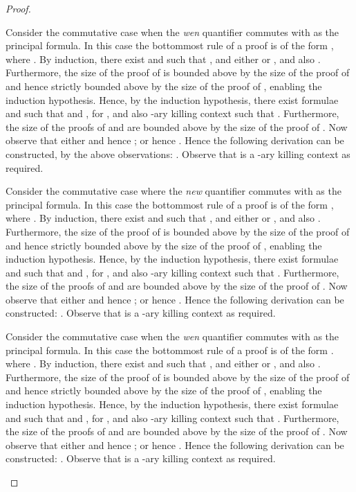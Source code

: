 \begin{proof}
\begin{enumerate}[label=\textbf{\Alph*},ref=\Alph*,leftmargin=*]
{Consider the commutative case when the \textit{wen} quantifier commutes with  as the principal formula.
In this case the bottommost rule of a proof is of the form , where .
By induction, there exist  and  such that ,  and either  or , and also
.
Furthermore, the size of the proof of  is bounded above by the size of the proof of  and hence strictly bounded above by the size of the proof of , enabling the induction hypothesis.
Hence, by the induction hypothesis, there exist formulae  and  such that  and , for , and also -ary killing context  such that
.
Furthermore, the size of the proofs of  and  are bounded above by the size of the proof of .
Now observe that either  and  hence
;
or  hence .
Hence the following derivation can be constructed, by the above observations:
.
Observe that  is a -ary killing context as required.
\smallskip



Consider the commutative case where the \textit{new} quantifier commutes with  as the principal formula.
In this case the bottommost rule of a proof is of the form ,
where .
By induction, there exist  and  such that ,  and either  or , and also
.
Furthermore, the size of the proof of  is bounded above by the size of the proof of  and hence strictly bounded above by the size of the proof of , enabling the induction hypothesis.
Hence, by the induction hypothesis, there exist formulae  and  such that  and , for , and also -ary killing context  such that
.
Furthermore, the size of the proofs of  and  are bounded above by the size of the proof of .
Now observe that either  and  hence
;
or  hence .
Hence the following derivation can be constructed:
.
Observe that  is a -ary killing context as required.
\smallskip


Consider the commutative case when the \textit{wen} quantifier commutes with  as the principal formula.
In this case the bottommost rule of a proof is of the form . where .
By induction, there exist  and  such that ,  and either  or , and also
.
Furthermore, the size of the proof of  is bounded above by the size of the proof of  and hence strictly bounded above by the size of the proof of , enabling the induction hypothesis.
Hence, by the induction hypothesis, there exist formulae  and  such that  and , for , and also -ary killing context  such that
.
Furthermore, the size of the proofs of  and  are bounded above by the size of the proof of .
Now observe that either  and  hence
;
or  hence .
Hence the following derivation can be constructed:
.
Observe that  is a -ary killing context as required.
\smallskip




}
\end{enumerate}
\end{proof}
